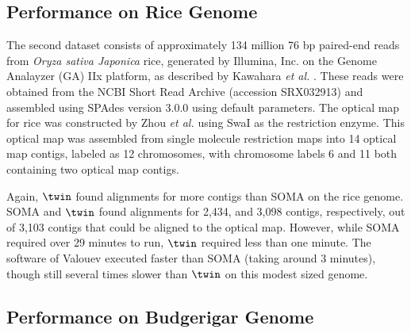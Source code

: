 \documentclass[doctor]{thesis}
\begin{document}
\subsection{Performance on Rice Genome} \label{section:rice}

The second dataset consists of approximately 134 million 76 bp paired-end reads from {\em Oryza sativa Japonica} rice, generated by Illumina, Inc. on the Genome Analayzer (GA) IIx platform, as described by Kawahara {\em et al.} \cite{kawahara2013improvement}.   These reads were obtained from the NCBI Short Read Archive (accession SRX032913) and assembled using SPAdes version 3.0.0 \cite{spades} using default parameters.  The optical map for rice was constructed by Zhou {\em et al.} \cite{RICE} using SwaI as the restriction enzyme.  This optical map was assembled from single molecule restriction maps into 14 optical map contigs, labeled as 12 chromosomes, with chromosome labels 6 and 11 both containing two optical map contigs.

Again, $\twin$ found alignments for more contigs than SOMA on the rice genome.  SOMA and $\twin$ found alignments for 2,434, and 3,098 contigs, respectively, out of 3,103 contigs that could be aligned to the optical map.  However, while SOMA required over 29 minutes to run, $\twin$ required less than one minute. 
The software of Valouev executed faster than SOMA (taking around 3 minutes), though still several times slower than $\twin$ on this modest sized genome.


\subsection{Performance on Budgerigar Genome} \label{section:parrot}
\end{document}
